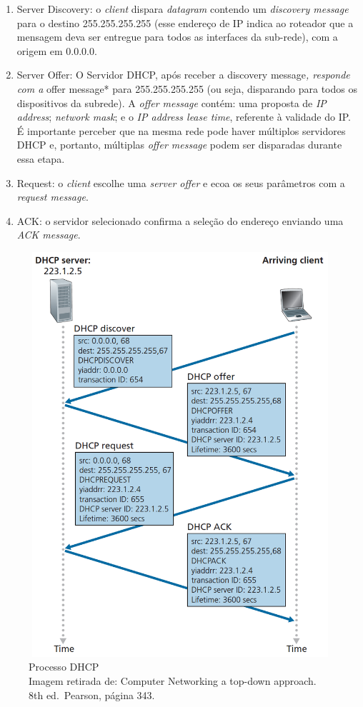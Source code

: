 \begin{enumerate}
\def\labelenumi{\arabic{enumi}.}
\tightlist
\item
  Server Discovery: o \emph{client} dispara \emph{datagram} contendo um
  \emph{discovery message} para o destino 255.255.255.255 (esse endereço
  de IP indica ao roteador que a mensagem deva ser entregue para todos
  as interfaces da sub-rede), com a origem em 0.0.0.0.
\item
  Server Offer: O Servidor DHCP, após receber a discovery message\emph{,
  responde com a }offer message* para 255.255.255.255 (ou seja,
  disparando para todos os dispositivos da subrede). A \emph{offer
  message} contém: uma proposta de \emph{IP address}; \emph{network
  mask}; e o \emph{IP address lease time}, referente à validade do IP. É
  importante perceber que na mesma rede pode haver múltiplos servidores
  DHCP e, portanto, múltiplas \emph{offer message} podem ser disparadas
  durante essa etapa.
\item
  Request: o \emph{client} escolhe uma \emph{server offer} e ecoa os
  seus parâmetros com a \emph{request message}.
\item
  ACK: o servidor selecionado confirma a seleção do endereço enviando
  uma \emph{ACK message}.
\end{enumerate}


\begin{figure}[h!]
\centering
\includegraphics[keepaspectratio, width=18cm, height=15cm]{imagens/13/13 - DHCP process.png}
\caption{Processo DHCP \\
Imagem retirada de: Computer Networking a top-down approach. 8th
ed.~Pearson, página 343. \\}
\label{Processo DHCP }
\end{figure}


